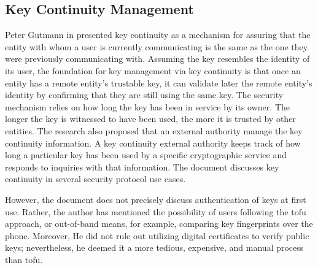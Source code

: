 \subsection{Key Continuity Management}
Peter Gutmann in \cite{gutmann-kcm-01} presented key continuity as a mechanism for assuring that the entity with whom a user is currently communicating is the same as the one they were previously communicating with.
Assuming the key resembles the identity of its user, the foundation for key management via key continuity is that once an entity has a remote entity's trustable key, it can validate later the remote entity's identity by confirming that they are still using the same key. The security mechanism relies on how long the key has been in service by its owner. The longer the key is witnessed to have been used, the more it is trusted by other entities. The research also proposed that an external authority manage the key continuity information. A key continuity external authority keeps track of how long a particular key has been used by a specific cryptographic service and responds to inquiries with that information. The document discusses key continuity in several security protocol use cases.
\par
However, the document does not precisely discuss authentication of keys at first use. Rather, the author has mentioned the possibility of users following the \gls{tofu} approach, or out-of-band means, for example, comparing key fingerprints over the phone. Moreover, He did not rule out utilizing digital certificates to verify public keys; nevertheless, he deemed it a more tedious, expensive, and manual process than \gls{tofu}. 

